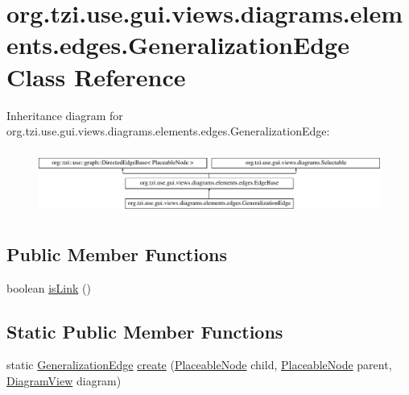 \hypertarget{classorg_1_1tzi_1_1use_1_1gui_1_1views_1_1diagrams_1_1elements_1_1edges_1_1_generalization_edge}{\section{org.\-tzi.\-use.\-gui.\-views.\-diagrams.\-elements.\-edges.\-Generalization\-Edge Class Reference}
\label{classorg_1_1tzi_1_1use_1_1gui_1_1views_1_1diagrams_1_1elements_1_1edges_1_1_generalization_edge}
}
Inheritance diagram for org.\-tzi.\-use.\-gui.\-views.\-diagrams.\-elements.\-edges.\-Generalization\-Edge\-:\begin{figure}[H]
\begin{center}
\leavevmode
\includegraphics[height=2.121212cm]{classorg_1_1tzi_1_1use_1_1gui_1_1views_1_1diagrams_1_1elements_1_1edges_1_1_generalization_edge}
\end{center}
\end{figure}
\subsection*{Public Member Functions}
\begin{DoxyCompactItemize}
\item 
boolean \hyperlink{classorg_1_1tzi_1_1use_1_1gui_1_1views_1_1diagrams_1_1elements_1_1edges_1_1_generalization_edge_aae35147247f8689af2f715a6cb2b735a}{is\-Link} ()
\end{DoxyCompactItemize}
\subsection*{Static Public Member Functions}
\begin{DoxyCompactItemize}
\item 
static \hyperlink{classorg_1_1tzi_1_1use_1_1gui_1_1views_1_1diagrams_1_1elements_1_1edges_1_1_generalization_edge}{Generalization\-Edge} \hyperlink{classorg_1_1tzi_1_1use_1_1gui_1_1views_1_1diagrams_1_1elements_1_1edges_1_1_generalization_edge_a15bc17e07ebe5873f91b23fddeb83ab8}{create} (\hyperlink{classorg_1_1tzi_1_1use_1_1gui_1_1views_1_1diagrams_1_1elements_1_1_placeable_node}{Placeable\-Node} child, \hyperlink{classorg_1_1tzi_1_1use_1_1gui_1_1views_1_1diagrams_1_1elements_1_1_placeable_node}{Placeable\-Node} parent, \hyperlink{classorg_1_1tzi_1_1use_1_1gui_1_1views_1_1diagrams_1_1_diagram_view}{Diagram\-View} diagram)
\end{DoxyCompactItemize}
